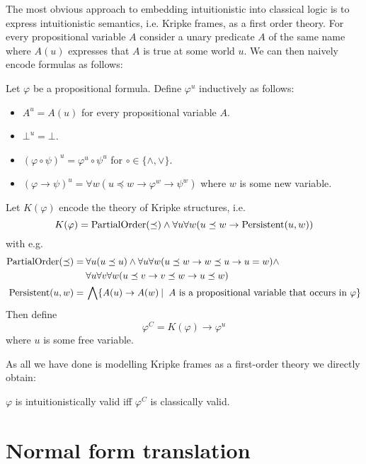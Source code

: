 \documentclass[runningheads]{llncs}
\begin{document}
The most obvious approach to embedding intuitionistic into classical logic is to express intuitionistic semantics, i.e. Kripke frames, as a first order theory. For every propositional variable $A$ consider a unary predicate $A$ of the same name where $A(u)$ expresses that $A$ is true at some world $u$. We can then naively encode formulas as follows:

\begin{definition}
	Let $\varphi$ be a propositional formula. Define $\varphi^{u}$ inductively as follows:
	\begin{itemize}
		\item $A^{u} = A(u)$ for every propositional variable $A$.
		\item $\bot^u = \bot$.
		\item $(\varphi\circ\psi)^u = \varphi^u\circ\psi^u$ for $\circ\in\{\wedge, \vee\}$.
		\item $(\varphi\to \psi)^u = \forall w(u\preceq w\to\varphi^{w}\to\psi^{w})$ where $w$ is some new variable.
	\end{itemize}
	Let $K(\varphi)$ encode the theory of Kripke structures, i.e.
	$$K(\varphi) = \text{\normalfont PartialOrder}(\preceq)\wedge\forall u\forall w(u\preceq w\to \text{\normalfont Persistent}(u, w))$$
	with e.g.
	\begin{align*}
		\text{\normalfont PartialOrder}(\preceq) =&\:\forall u(u\preceq u)\wedge\forall u\forall w(u\preceq w\to w\preceq u\to u = w)\wedge\\&\:\forall u\forall v\forall w(u\preceq v\to v\preceq w\to u\preceq w)\\
		\text{\normalfont Persistent}(u, w)=&\:\bigwedge \{A(u)\to A(w)\:|\: \text{ $A$ is a propositional variable that occurs in $\varphi$}\}
	\end{align*}
	Then define
	$$\varphi^{C} = K(\varphi)\to \varphi^{u}$$
	where $u$ is some free variable.
\end{definition}

\noindent As all we have done is modelling Kripke frames as a first-order theory we directly obtain:

\begin{lemma}
	$\varphi$ is intuitionistically valid iff $\varphi^C$ is classically valid.
\end{lemma}

\section{Normal form translation}
\label{section:tseytin}
\end{document}

